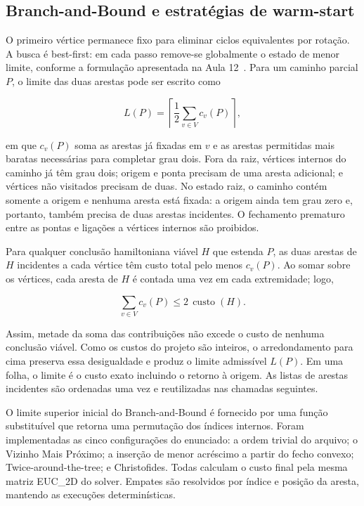 \documentclass[12pt]{article}
\begin{document}
\subsection{Branch-and-Bound e estratégias de warm-start}

O primeiro vértice permanece fixo para eliminar ciclos equivalentes por
rotação. A busca é best-first: em cada passo remove-se globalmente o estado de
menor limite, conforme a formulação apresentada na Aula 12~\cite{vimieiro2026aula12}.
Para um caminho parcial $P$, o limite das duas arestas pode ser escrito como

\[
  L(P)=\left\lceil\frac{1}{2}\sum_{v\in V} c_v(P)\right\rceil,
\]

em que $c_v(P)$ soma as arestas já fixadas em $v$ e as arestas permitidas mais
baratas necessárias para completar grau dois. Fora da raiz, vértices internos
do caminho já têm grau dois; origem e ponta precisam de uma aresta adicional;
e vértices não visitados precisam de duas. No estado raiz, o caminho contém
somente a origem e nenhuma aresta está fixada: a origem ainda tem grau zero e,
portanto, também precisa de duas arestas incidentes. O fechamento prematuro
entre as pontas e ligações a vértices internos são proibidos.

Para qualquer conclusão hamiltoniana viável $H$ que estenda $P$, as duas
arestas de $H$ incidentes a cada vértice têm custo total pelo menos
$c_v(P)$. Ao somar sobre os vértices, cada aresta de $H$ é contada uma vez em
cada extremidade; logo,

\[
  \sum_{v\in V} c_v(P) \leq 2\,\operatorname{custo}(H).
\]

Assim, metade da soma das contribuições não excede o custo de nenhuma conclusão
viável. Como os custos do projeto são inteiros, o arredondamento para cima
preserva essa desigualdade e produz o limite admissível $L(P)$. Em uma folha, o
limite é o custo exato incluindo o retorno à origem. As listas de arestas
incidentes são ordenadas uma vez e reutilizadas nas chamadas seguintes.

O limite superior inicial do Branch-and-Bound é fornecido por uma função
substituível que retorna uma permutação dos índices internos. Foram
implementadas as cinco configurações do enunciado: a ordem trivial do arquivo;
o Vizinho Mais Próximo; a inserção de menor acréscimo a partir do fecho convexo;
Twice-around-the-tree; e Christofides. Todas calculam o custo final pela mesma
matriz EUC\_2D do solver. Empates são resolvidos por índice e posição da aresta,
mantendo as execuções determinísticas.
\end{document}
